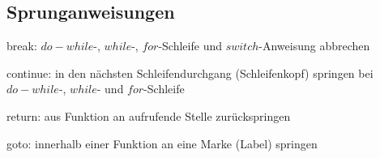 	\subsection{Sprunganweisungen }
		\begin{compactitem}
			\item break: $do-while$-, $while$-,  $for$-Schleife und $switch$-Anweisung abbrechen
			\item continue: in den nächsten Schleifendurchgang (Schleifenkopf) springen bei $do-while$-, $while$- und $for$-Schleife 
			\item return: aus Funktion an aufrufende Stelle zurückspringen
			\item goto: innerhalb einer Funktion an eine Marke (Label) springen
		\end{compactitem}